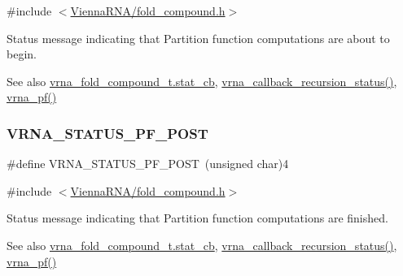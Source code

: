 {\ttfamily \#include $<$\hyperlink{fold__compound_8h}{Vienna\+R\+N\+A/fold\+\_\+compound.\+h}$>$}



Status message indicating that Partition function computations are about to begin. 

\begin{DoxySeeAlso}{See also}
\hyperlink{group__fold__compound_a87a83f6795b569000efcbe65acc3dd81}{vrna\+\_\+fold\+\_\+compound\+\_\+t.\+stat\+\_\+cb}, \hyperlink{group__fold__compound_gac86036fa8cad1108832335063243cdc8}{vrna\+\_\+callback\+\_\+recursion\+\_\+status()}, \hyperlink{group__pf__fold_ga29e256d688ad221b78d37f427e0e99bc}{vrna\+\_\+pf()} 
\end{DoxySeeAlso}
\mbox{\label{group__fold__compound_ga1c6fa243533fd026e50f7d595eaaa565}} 
\subsubsection{\texorpdfstring{V\+R\+N\+A\+\_\+\+S\+T\+A\+T\+U\+S\+\_\+\+P\+F\+\_\+\+P\+O\+ST}{VRNA\_STATUS\_PF\_POST}}
{\footnotesize\ttfamily \#define V\+R\+N\+A\+\_\+\+S\+T\+A\+T\+U\+S\+\_\+\+P\+F\+\_\+\+P\+O\+ST~(unsigned char)4}



{\ttfamily \#include $<$\hyperlink{fold__compound_8h}{Vienna\+R\+N\+A/fold\+\_\+compound.\+h}$>$}



Status message indicating that Partition function computations are finished. 

\begin{DoxySeeAlso}{See also}
\hyperlink{group__fold__compound_a87a83f6795b569000efcbe65acc3dd81}{vrna\+\_\+fold\+\_\+compound\+\_\+t.\+stat\+\_\+cb}, \hyperlink{group__fold__compound_gac86036fa8cad1108832335063243cdc8}{vrna\+\_\+callback\+\_\+recursion\+\_\+status()}, \hyperlink{group__pf__fold_ga29e256d688ad221b78d37f427e0e99bc}{vrna\+\_\+pf()} 
\end{DoxySeeAlso}
\mbox{\label{group__fold__compound_gae63be9127fe7dcc1f9bb14f5bb1064ee}} 
